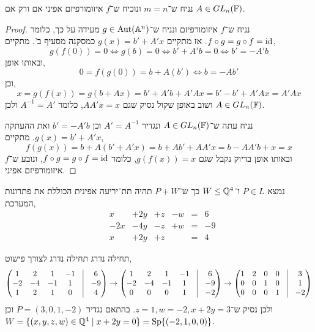 \subquestion{}
נניח ש־$m = n$ ונוכיח ש־$f$ איזומורפיזם אפיני אם ורק אם $A \in GL_n(\mathbb{F})$.
\begin{proof}
	נניח ש־$f$ איזומורפיזם ונניח ש־$g \in \operatorname{Aut}(\mathbb{A}^n)$ מעידה על כך, כלומר $f \circ g = g \circ f = \operatorname{id}$.
	אז מתקיים $g(x) = b' + A'x$ כמסקנה מסעיף ב'.
	מתקיים,
	\[
		g(f(0)) = 0
		\iff g(b) = 0
		\iff b' + A'b = 0
		\iff b' = -A'b
	\]
	ובאותו אופן,
	\[
		0
		= f(g(0))
		= b + A(b')
		\iff b = -A b'
	\]
	וכן,
	\[
		x
		= g(f(x))
		= g(b + Ax)
		= b' + A'b + A'Ax
		= b' - b' + A'Ax
		= A'Ax
	\]
	ושוב באופן שקול נסיק שגם $A A' x = x$, כלומר $A^{-1} = A'$ ולכן $A \in GL_n(\mathbb{F})$.

	נניח עתה ש־$A \in GL_n(\mathbb{F})$ ונגדיר $A' = A^{-1}$ וכן $b' = -A'b$ ואת ההעתקה $g(x) = b' + A'x$.
	מתקיים,
	\[
		f(g(x))
		= b + A(b' + A'x)
		= b + Ab' + A A' x
		= b - A A' b + x
		= x
	\]
	ובאותו אופן בדיוק נקבל שגם $g(f(x)) = x$, כלומר $f \circ g = g \circ f = \operatorname{id}$, ונובע ש־$f$ איזומורפיזם אפיני.
\end{proof}

\question{}
נמצא $P \in L$ ו־$W \le \mathbb{Q}^4$ כך ש־$P + W$ תהיה תת־יריעה אפינית הכוללת את פתרונות המערכת,
\begin{align*}
	& x & + 2y & + z & - w & = & 6 \\
	& -2x & - 4y & - z & + w & = & -9 \\
	& x & + 2y & + z & & = & 4
\end{align*}
\begin{solution}
	תחילה נדרג תחילה נדרג לצורך פישוט,
	\[
		\begin{pmatrix}
			1 & 2 & 1 & -1 & \vline & 6 \\
			-2 & -4 & -1 & 1 & \vline & -9 \\
			1 & 2 & 1 & 0 & \vline & 4 \\
		\end{pmatrix}
		\to
		\begin{pmatrix}
			1 & 2 & 1 & -1 & \vline & 6 \\
			-2 & -4 & -1 & 1 & \vline & -9 \\
			0 & 0 & 0 & 1 & \vline & -2 \\
		\end{pmatrix}
		\to
		\begin{pmatrix}
			1 & 2 & 0 & 0 & \vline & 3 \\
			0 & 0 & 1 & 0 & \vline & 1 \\
			0 & 0 & 0 & 1 & \vline & -2 \\
		\end{pmatrix}
	\]
	ולכן נסיק ש־$z = 1, w = -2, x + 2y = 3$.
	בהתאם נגדיר $P = (3, 0, 1, -2)$ וכן $W = \{ (x, y, z, w) \in \mathbb{Q}^4 \mid x + 2y = 0 \} = \operatorname{Sp}\{(-2, 1, 0, 0)\}$.
\end{solution}


